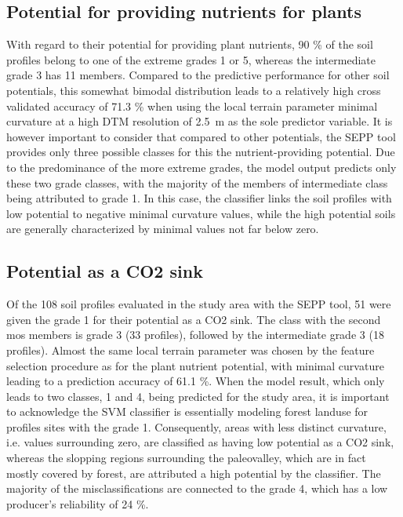 \documentclass[soilsystems,article,submit,moreauthors,pdftex,10pt,a4paper]{Definitions/mdpi}
\begin{document}
\subsection{Potential for providing nutrients for plants}
With regard to their potential for providing plant nutrients, 90 \% of the soil profiles belong to one of the extreme grades 1 or 5, whereas the intermediate grade 3 has 11 members. Compared to the predictive performance for other soil potentials, this somewhat bimodal distribution leads to a relatively high cross validated accuracy of 71.3 \% when using the local terrain parameter minimal curvature at a high DTM resolution of 2.5~m as the sole predictor variable. It is however important to consider that compared to other potentials, the SEPP tool provides only three possible classes for this the nutrient-providing potential. Due to the predominance of the more extreme grades, the model output predicts only these two grade classes, with the majority of the members of intermediate class being attributed to grade 1. In this case, the classifier links the soil profiles with low potential to negative minimal curvature values, while the high potential soils are generally characterized by minimal values not far below zero.
\subsection{Potential as a CO2 sink}
Of the 108 soil profiles evaluated in the study area with the SEPP tool, 51 were given the grade 1 for their potential as a CO2 sink. The class with the second mos members is grade 3 (33 profiles), followed by the intermediate grade 3 (18 profiles). Almost the same local terrain parameter was chosen by the feature selection procedure as for the plant nutrient potential, with minimal curvature leading to a prediction accuracy of 61.1 \%. When  the model result, which only leads to two classes, 1 and 4, being predicted for the study area, it is important to acknowledge the SVM classifier is essentially modeling forest landuse for profiles sites with the grade 1. Consequently, areas with less distinct curvature, i.e. values surrounding zero, are classified as having low potential as a CO2 sink, whereas the slopping regions surrounding the paleovalley, which are in fact mostly covered by forest, are attributed a high potential by the classifier. The majority of the misclassifications are connected to the grade 4, which has a low producer's reliability of 24 \%.
\end{document}
